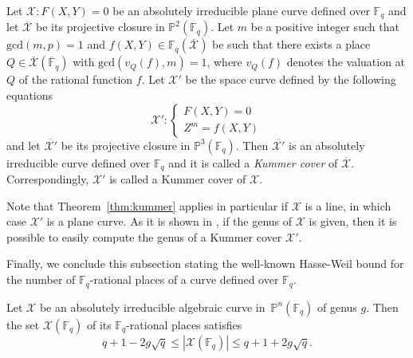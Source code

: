 \begin{theorem}
\label{thm:kummer}
Let $\mathcal{X}: F(X,Y)=0$ be an absolutely irreducible plane curve defined over $\mathbb{F}_q$ and let $\overline{\mathcal{X}}$ be its projective closure in $\mathbb{P}^2(\mathbb{F}_q)$. Let $m$ be a positive integer such that $\mathrm{gcd}(m,p)=1$ and $f(X,Y)\in \mathbb{F}_q(\overline{\mathcal{X}})$ be such that there exists a place $Q\in \overline{\mathcal{X}}(\overline{\mathbb{F}}_q)$ with $\mathrm{gcd}(v_Q(f),m)=1$, where $v_Q(f)$ denotes the valuation at $Q$ of the rational function $f$. 
Let $\mathcal{X}'$ be the space curve defined by the following equations
\begin{equation*}
    \mathcal{X}': \begin{cases}
    F(X,Y) = 0\\
    Z^m = f(X,Y)
    \end{cases}
\end{equation*}
and let $\overline{\mathcal{X}'}$ be its projective closure in $\mathbb{P}^3(\mathbb{F}_q)$.
Then $\overline{\mathcal{X}'}$ is an absolutely irreducible curve defined over $\mathbb{F}_q$ and it is called a \emph{Kummer cover} of $\overline{\mathcal{X}}$. Correspondingly, $\mathcal{X}'$ is called a Kummer cover of $\mathcal{X}$.
\end{theorem} 

Note that  Theorem~\ref{thm:kummer} applies in particular if $\mathcal{X}$ is a line, in which case $\mathcal{X}'$ is a plane curve.
As it is shown in \cite[Corollary 3.7.4]{Stichtenoth}, if the genus of $\mathcal{X}$ is given, then it is possible to easily compute the genus of a Kummer cover $\mathcal{X}'$.

Finally, we conclude this subsection stating the well-known Hasse-Weil bound for the number of $\mathbb{F}_q$-rational places of a curve defined over $\mathbb{F}_q$.

\begin{theorem}
\label{thm:hasse-weil}
Let $\mathcal{X}$ be an absolutely irreducible algebraic curve in~$\mathbb{P}^n(\mathbb{F}_q)$ of genus $g$. Then the set $\mathcal{X}(\mathbb{F}_q)$ of its $\mathbb{F}_q$-rational places satisfies
\begin{equation}\label{EQ:HW2}
    q + 1 - 2g\sqrt{q} \leq |\mathcal{X}(\mathbb{F}_q)| \leq q + 1 + 2g\sqrt{q}.
\end{equation}
\end{theorem}

